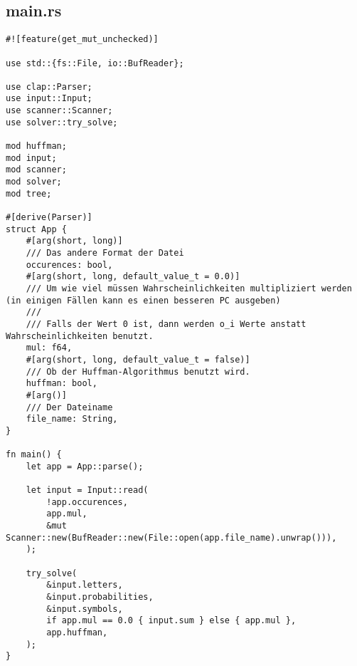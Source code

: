 \subsection{main.rs}
\begin{lstlisting}
#![feature(get_mut_unchecked)]

use std::{fs::File, io::BufReader};

use clap::Parser;
use input::Input;
use scanner::Scanner;
use solver::try_solve;

mod huffman;
mod input;
mod scanner;
mod solver;
mod tree;

#[derive(Parser)]
struct App {
    #[arg(short, long)]
    /// Das andere Format der Datei
    occurences: bool,
    #[arg(short, long, default_value_t = 0.0)]
    /// Um wie viel müssen Wahrscheinlichkeiten multipliziert werden (in einigen Fällen kann es einen besseren PC ausgeben)
    /// 
    /// Falls der Wert 0 ist, dann werden o_i Werte anstatt Wahrscheinlichkeiten benutzt.
    mul: f64,
    #[arg(short, long, default_value_t = false)]
    /// Ob der Huffman-Algorithmus benutzt wird.
    huffman: bool,
    #[arg()]
    /// Der Dateiname
    file_name: String,
}

fn main() {
    let app = App::parse();

    let input = Input::read(
        !app.occurences,
        app.mul,
        &mut Scanner::new(BufReader::new(File::open(app.file_name).unwrap())),
    );

    try_solve(
        &input.letters,
        &input.probabilities,
        &input.symbols,
        if app.mul == 0.0 { input.sum } else { app.mul },
        app.huffman,
    );
}
\end{lstlisting}
